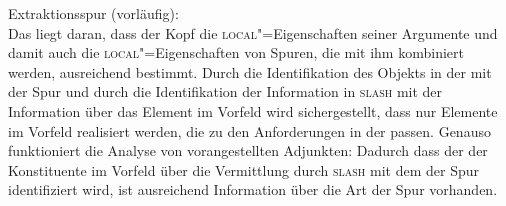 \eas
\label{le-Extraktionsspur}%
Extraktionsspur (vorläufig): \\
\zs
Das liegt daran, dass der Kopf die \textsc{local}"=Eigenschaften seiner Argumente und damit auch die
\textsc{local}"=Eigenschaften von Spuren, die mit ihm kombiniert werden, ausreichend bestimmt. Durch
die Identifikation des Objekts in der \compsl mit der Spur und durch die Identifikation der
Information in \textsc{slash} mit der Information über das Element im Vorfeld wird sichergestellt,
dass nur Elemente im Vorfeld realisiert werden, die zu den Anforderungen in der \compsl
passen. Genauso funktioniert die Analyse von vorangestellten Adjunkten: Dadurch dass der
\localw der Konstituente im Vorfeld über die Vermittlung durch \textsc{slash} mit dem \localw der Spur
identifiziert wird, ist ausreichend Information über die Art der Spur vorhanden.


